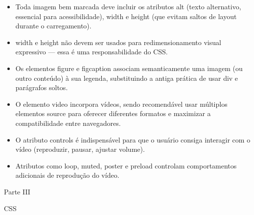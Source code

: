\begin{itemize}
  \item Toda imagem bem marcada deve incluir os atributos alt (texto alternativo, essencial para acessibilidade), width e height (que evitam saltos de layout durante o carregamento).
\end{itemize}

\begin{itemize}
  \item width e height não devem ser usados para redimensionamento visual expressivo — essa é uma responsabilidade do CSS.
\end{itemize}

\begin{itemize}
  \item Os elementos figure e figcaption associam semanticamente uma imagem (ou outro conteúdo) à sua legenda, substituindo a antiga prática de usar div e parágrafos soltos.
\end{itemize}

\begin{itemize}
  \item O elemento video incorpora vídeos, sendo recomendável usar múltiplos elementos source para oferecer diferentes formatos e maximizar a compatibilidade entre navegadores.
\end{itemize}

\begin{itemize}
  \item O atributo controls é indispensável para que o usuário consiga interagir com o vídeo (reproduzir, pausar, ajustar volume).
\end{itemize}

\begin{itemize}
  \item Atributos como loop, muted, poster e preload controlam comportamentos adicionais de reprodução do vídeo.
\end{itemize}

Parte III

\begin{codebox}{CSS}

\end{codebox}
